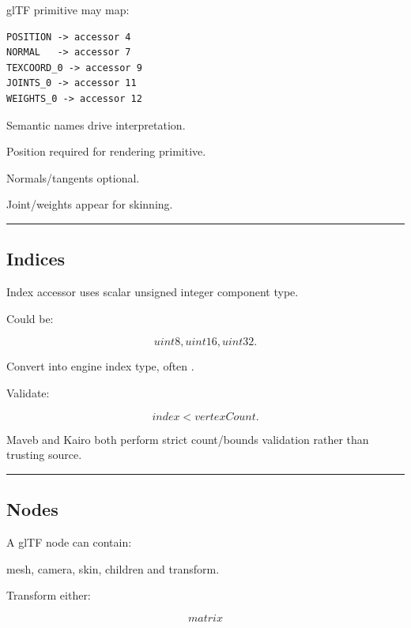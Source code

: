 \hypertarget{04-visual-computing-ii-ch041-primitive-attributes}{}

glTF primitive may map:

\begin{verbatim}
POSITION -> accessor 4
NORMAL   -> accessor 7
TEXCOORD_0 -> accessor 9
JOINTS_0 -> accessor 11
WEIGHTS_0 -> accessor 12
\end{verbatim}

Semantic names drive interpretation.

Position required for rendering primitive.

Normals/tangents optional.

Joint/weights appear for skinning.

\begin{center}\rule{0.5\linewidth}{0.5pt}\end{center}

\subsection{Indices}\label{04-visual-computing-ii-ch041-indices}

\hypertarget{04-visual-computing-ii-ch041-indices}{}

Index accessor uses scalar unsigned integer component type.

Could be:

\[
uint8,uint16,uint32.
\]

Convert into engine index type, often .

Validate:

\[
index<vertexCount.
\]

Maveb and Kairo both perform strict count/bounds validation rather than trusting source.

\begin{center}\rule{0.5\linewidth}{0.5pt}\end{center}

\subsection{Nodes}\label{04-visual-computing-ii-ch041-nodes}

\hypertarget{04-visual-computing-ii-ch041-nodes}{}

A glTF node can contain:

mesh, camera, skin, children and transform.

Transform either:

\[
matrix
\]

